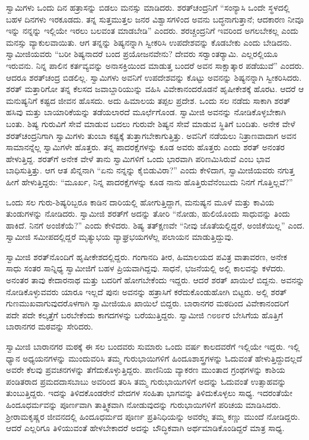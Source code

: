  ಸ್ವಾಮಿಗಳು ಒಂದು ದಿನ ಹತ್ರಾಸನ್ನು ಬಿಡಲು ಮನಸ್ಸು ಮಾಡಿದರು. ಶರತ್‍ಚಂದ್ರನಿಗೆ “ಸಂನ್ಯಾಸಿ ಒಂದೇ ಸ್ಥಳದಲ್ಲಿ ಬಹಳ ದಿನಗಳು ಇರಕೂಡದು. ತನ್ನ ಸುತ್ತಮುತ್ತಲ ಜನರ ವಿಶ್ವಾಸಗಳಿಂದ ಅವನು ಬದ್ಧನಾಗುತ್ತಾನೆ; ಆದಕಾರಣ ನೀವೂ ಇನ್ನು ನನ್ನನ್ನು ಇಲ್ಲಿಯೇ ಇರಲು ಬಲವಂತ ಮಾಡಬೇಡಿ” ಎಂದರು. ಶರಚ್ಚಂದ್ರನಿಗೆ ಇವರಿಂದ ಅಗಲಬೇಕಲ್ಲ ಎಂದು ಮನಸ್ಸು ವ್ಯಾಕುಲವಾಯಿತು. ಆಗ ತನ್ನನ್ನು ಶಿಷ್ಯನನ್ನಾಗಿ ಸ್ವೀಕರಿಸಿ ಉಪದೇಶವನ್ನು ಕೊಡಬೇಕು ಎಂದು ಬೇಡಿದನು. ಸ್ವಾಮೀಜಿಯವರು “ಬರೀ ಶಿಷ್ಯನಾದರೆ ಬಂದ ಪ್ರಯೋಜನವೇನು? ದೇವರು ಸರ‍್ವಾಂತರ‍್ಯಾಮಿ. ಎಲ್ಲರಲ್ಲಿಯೂ ಇರುವನು. ನಿನ್ನ ಪಾಲಿನ ಕರ್ತವ್ಯವನ್ನು ಅನಾಸಕ್ತಿಯಿಂದ ಮಾಡುತ್ತ ಬಂದರೆ ಅವನ ಸಾಕ್ಷಾತ್ಕಾರ ಪಡೆಯುವೆ” ಎಂದರು. ಆದರೂ ಶರತ್‍ಚಂದ್ರ ಬಿಡಲಿಲ್ಲ. ಸ್ವಾಮಿಗಳು ಅವನಿಗೆ ಉಪದೇಶವನ್ನು ಕೊಟ್ಟು ಅವನನ್ನು ಶಿಷ್ಯನನ್ನಾಗಿ ಸ್ವೀಕರಿಸಿದರು. ಶರತ್ ಮತ್ತಾರಿಗೋ ತನ್ನ ಕೆಲಸದ ಜವಾಬ್ದಾರಿಯುನ್ನು ವಹಿಸಿ ವಿವೇಕಾನಂದರೊಡನೆ ಹೃಷೀಕೇಶಕ್ಕೆ ಹೊರಟ. ಆದರೆ ಆ ಮನುಷ್ಯನಿಗೆ ಕಷ್ಟದ ಜೀವನ ಹೊಸದು. ಅದು ಹಿಮಾಲಯ ತಪ್ಪಲ ಪ್ರದೇಶ. ಒಂದು ಸಲ ನಡೆದು ಸಾಕಾಗಿ ಶರತ್ ಹಸಿವು ಮತ್ತು ಬಾಯಾರಿಕೆಯನ್ನು ತಡೆಯಲಾರದೆ ಮೂರ್ಛೆಗೊಂಡ. ಸ್ವಾಮೀಜಿ ಅವನನ್ನು ನೋಡಿಕೊಳ್ಳಬೇಕಾಗಿ ಬಂತು. ಶಿಷ್ಯ ಗುರುವಿಗೆ ಸೇವೆ ಮಾಡುವ ಬದಲು ಗುರುವೇ ಶಿಷ್ಯನ ಸೇವೆ ಮಾಡುವ ಸ್ಥಿತಿಗೆ ಬಂದಿತು. ಅನೇಕ ವೇಳೆ ಶರತ್‍ಚಂದ್ರನಿಗಾಗಿ ಸ್ವಾಮಿಗಳು ತುಂಬಾ ಕಷ್ಟಕ್ಕೆ ತುತ್ತಾಗಬೇಕಾಗುತ್ತಿತ್ತು. ಅವನಿಗೆ ನಡೆಯಲು ನಿತ್ರಾಣವಾದಾಗ ಅವನ ಸಾಮಾನನ್ನೆಲ್ಲ ಸ್ವಾಮಿಗಳೇ ಹೊತ್ತರು. ತನ್ನ ಪಾದರಕ್ಷೆಗಳನ್ನು ಕೂಡ ಅವರು ಹೊತ್ತರು ಎಂದು ಶರತ್ ಅನಂತರ ಹೇಳುತ್ತಿದ್ದ. ಶರತ್‍ಗೆ ಅನೇಕ ವೇಳೆ ತಾನು ಸ್ವಾಮಿಗಳಿಗೆ ಒಂದು ಭಾರವಾಗಿ ಪರಿಣಮಿಸಿರುವೆ ಎಂಬ ಭಾವ ಬಾಧಿಸುತ್ತಿತ್ತು. ಆಗ ಆತ ಖಿನ್ನನಾಗಿ “ಏನು ನನ್ನನ್ನು ಕೈಬಿಡುವಿರಾ?” ಎಂದು ಕೇಳಿದಾಗ, ಸ್ವಾಮೀಜಿಯವರು ನಗುತ್ತ ಹೀಗೆ ಹೇಳುತ್ತಿದ್ದರು: “ಮೂರ್ಖ, ನಿನ್ನ ಪಾದರಕ್ಷೆಗಳನ್ನು ಕೂಡ ನಾನು ಹೊತ್ತಿರುವೆನೆಂಬುದು ನಿನಗೆ ಗೊತ್ತಿಲ್ಲವೆ?” 

 ಒಂದು ಸಲ ಗುರು-ಶಿಷ್ಯರಿಬ್ಬರೂ ಕಾಡಿನ ದಾರಿಯಲ್ಲಿ ಹೋಗುತ್ತಿದ್ದಾಗ, ಮನುಷ್ಯನ ಮೂಳೆ ಮತ್ತು ಕಾವಿಯ ತುಂಡುಗಳನ್ನು ನೋಡಿದರು. ಸ್ವಾಮೀಜಿ ಶರತ್‍ಗೆ ಅದನ್ನು ತೋರಿ “ನೋಡು, ಹುಲಿಯೊಂದು ಸಾಧುವನ್ನು ತಿಂದು ಹಾಕಿದೆ. ನಿನಗೆ ಅಂಜಿಕೆಯೆ?” ಎಂದು ಕೇಳಿದರು. ಶಿಷ್ಯ ತತ್‍ಕ್ಷಣವೇ “ನೀವು ಜೊತೆಯಲ್ಲಿದ್ದರೆ, ಅಂಜಿಕೆಯಿಲ್ಲ” ಎಂದ. ಸ್ವಾಮೀಜಿ ಸಮೀಪದಲ್ಲಿದ್ದರೆ ಮೃತ್ಯುಭಯ ವ್ಯಾಘ್ರಭಯಗಳೆಲ್ಲ ಪಲಾಯನ ಮಾಡುತ್ತಿದ್ದುವು. 

 ಸ್ವಾಮೀಜಿ ಶರತ್​ನೊಂದಿಗೆ ಹೃಷೀಕೇಶದಲ್ಲಿದ್ದರು. ಗಂಗಾನದಿ ತೀರ, ಹಿಮಾಲಯದ ಪವಿತ್ರ ವಾತಾವರಣ, ಅನೇಕ ಸಾಧು ಸಂತರ ಸಾನ್ನಿಧ್ಯ ಸ್ವಾಮೀಜಿಗೆ ಬಹಳ ಪ್ರಿಯವಾಗಿದ್ದವು. ಸಾಧನೆ, ಭಜನೆಯಲ್ಲಿ ಅಲ್ಲಿ ಕಾಲವನ್ನು ಕಳೆದರು. ಅನಂತರ ತಾವು ಕೇದಾರನಾಥ ಮತ್ತು ಬದರಿಗೆ ಹೋಗಬೇಕೆಂದು ಇದ್ದರು. ಆದರೆ ಶರತ್ ಖಾಯಿಲೆ ಬಿದ್ದನು. ಅವನನ್ನು ನೋಡಿಕೊಳ್ಳುವವರು ಯಾರೂ ಇಲ್ಲದೆ ಪುನಃ ಅವನನ್ನು ಹತ್ರಾಸಿಗೆ ಕರೆದುಕೊಂಡುಹೋಗಿ ಬಿಟ್ಟರು. ಅಲ್ಲಿ ಶರತ್ ಗುಣಮುಖವಾಗುವುದರೊಳಗಾಗಿ ಸ್ವಾಮೀಜಿಯೂ ಖಾಯಿಲೆ ಬಿದ್ದರು. ಬಾರಾನಗರ ಮಠದಿಂದ ವಿವೇಕಾನಂದರಿಗೆ ಪದೇ ಪದೇ ಕಲ್ಕತ್ತೆಗೆ ಬರಬೇಕೆಂದು ಕಾಗದಗಳನ್ನು ಬರೆಯುತ್ತಿದ್ದರು. ಸ್ವಾಮೀಜಿ ೧೮೮೯ರ ಬೇಸಿಗೆಯ ಹೊತ್ತಿಗೆ ಬಾರಾನಗರ ಮಠವನ್ನು ಸೇರಿದರು. 

 ಸ್ವಾಮೀಜಿ ಬಾರಾನಗರ ಮಠಕ್ಕೆ ಈ ಸಲ ಬಂದವರು ಸುಮಾರು ಒಂದು ವರ್ಷ ಕಾಲದವರೆಗೆ ಇಲ್ಲಿಯೇ ಇದ್ದರು. ಇಲ್ಲಿ ಧ್ಯಾನ ಅಧ್ಯಯನಗಳನ್ನು ಮುಂದುವರಿಸಿ ತಮ್ಮ ಗುರುಭಾಯಿಗಳಿಗೆ ಹಿಂದೂಶಾಸ್ತ್ರಗಳನ್ನು ಓದುವಂತೆ ಹೇಳುತ್ತಿದ್ದುದಲ್ಲದೆ ಅವರೇ ಕೆಲವು ಪ್ರವಚನಗಳನ್ನು ತೆಗೆದುಕೊಳ್ಳುತ್ತಿದ್ದರು. ಪಾಣಿನಿಯ ವ್ಯಾಕರಣ ಮುಂತಾದ ಗ್ರಂಥಗಳನ್ನು ಕಾಶಿಯ ಪಂಡಿತರಾದ ಪ್ರಮದದಾಸಬಾಬು ಅವರಿಂದ ತರಿಸಿ ತಮ್ಮ ಗುರುಭಾಯಿಗಳಿಗೆ ಅದನ್ನು ಓದುವಂತೆ ಉತ್ಸಾಹವನ್ನು ತುಂಬುತ್ತಿದ್ದರು. ಇದನ್ನು ತಿಳಿದಕೊಂಡರೇನೆ ವೇದಗಳ ಸಂಹಿತಾ ಭಾಗವನ್ನು ತಿಳಿದುಕೊಳ್ಳಲು ಸಾಧ್ಯ. ಇದರಂತೆಯೇ ಹಿಂದೂಧರ್ಮವನ್ನು ಪೂರ್ಣವಾಗಿ ತಾತ್ತ್ವಿಕವಾಗಿ ನೋಡುವುದನ್ನು ಗುರುಭಾಯಿಗಳಿಗೆ ಪರಿಚಯ ಮಾಡಿಸಿದರು. ಶ‍್ರೀರಾಮಕೃಷ್ಣರ ಜೀವನದಲ್ಲಿ ಹಿಂದೂಧರ್ಮದ ಪೂರ್ಣ ಪ್ರತಿನಿಧಿಯನ್ನು ಅವರೆಲ್ಲ ತಮ್ಮ ಕಣ್ಣು ಮುಂದೆ ನೋಡಿದ್ದರು. ಆದರೆ ಎಲ್ಲರಿಗೂ ತಿಳಿಯುವಂತೆ ಹೇಳಬೇಕಾದರೆ ಅದನ್ನು ಬೌದ್ಧಿಕವಾಗಿ ಅರ್ಥಮಾಡಿಕೊಂಡಿದ್ದರೆ ಮಾತ್ರ ಸಾಧ್ಯ. 

